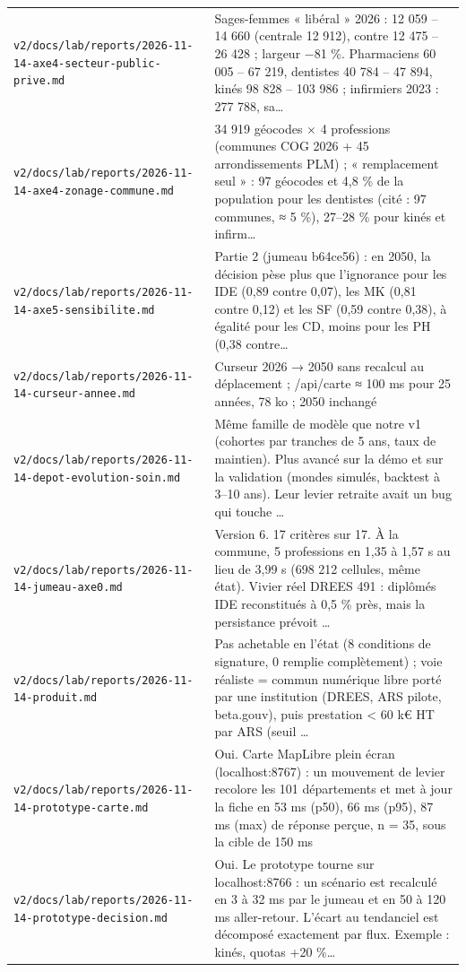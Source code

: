 \begin{small}
\begin{longtable}{@{}p{}p{}@{}}
\texttt{v2/docs/lab/reports/2026-11-14-axe4-secteur-public-prive.md} & Sages-femmes « libéral » 2026 : 12 059 – 14 660 (centrale 12 912), contre 12 475 – 26 428 ; largeur −81 \%. Pharmaciens 60 005 – 67 219, dentistes 40 784 – 47 894, kinés 98 828 – 103 986 ; infirmiers 2023 : 277 788, sa… \\
\texttt{v2/docs/lab/reports/2026-11-14-axe4-zonage-commune.md} & 34 919 géocodes × 4 professions (communes COG 2026 + 45 arrondissements PLM) ; « remplacement seul » : 97 géocodes et 4,8 \% de la population pour les dentistes (cité : 97 communes, ≈ 5 \%), 27–28 \% pour kinés et infirm… \\
\texttt{v2/docs/lab/reports/2026-11-14-axe5-sensibilite.md} & Partie 2 (jumeau b64ce56) : en 2050, la décision pèse plus que l'ignorance pour les IDE (0,89 contre 0,07), les MK (0,81 contre 0,12) et les SF (0,59 contre 0,38), à égalité pour les CD, moins pour les PH (0,38 contre… \\
\texttt{v2/docs/lab/reports/2026-11-14-curseur-annee.md} & Curseur 2026 → 2050 sans recalcul au déplacement ; /api/carte ≈ 100 ms pour 25 années, 78 ko ; 2050 inchangé \\
\texttt{v2/docs/lab/reports/2026-11-14-depot-evolution-soin.md} & Même famille de modèle que notre v1 (cohortes par tranches de 5 ans, taux de maintien). Plus avancé sur la démo et sur la validation (mondes simulés, backtest à 3–10 ans). Leur levier retraite avait un bug qui touche … \\
\texttt{v2/docs/lab/reports/2026-11-14-jumeau-axe0.md} & Version 6. 17 critères sur 17. À la commune, 5 professions en 1,35 à 1,57 s au lieu de 3,99 s (698 212 cellules, même état). Vivier réel DREES 491 : diplômés IDE reconstitués à 0,5 \% près, mais la persistance prévoit … \\
\texttt{v2/docs/lab/reports/2026-11-14-produit.md} & Pas achetable en l'état (8 conditions de signature, 0 remplie complètement) ; voie réaliste = commun numérique libre porté par une institution (DREES, ARS pilote, beta.gouv), puis prestation < 60 k€ HT par ARS (seuil … \\
\texttt{v2/docs/lab/reports/2026-11-14-prototype-carte.md} & Oui. Carte MapLibre plein écran (localhost:8767) : un mouvement de levier recolore les 101 départements et met à jour la fiche en 53 ms (p50), 66 ms (p95), 87 ms (max) de réponse perçue, n = 35, sous la cible de 150 ms \\
\texttt{v2/docs/lab/reports/2026-11-14-prototype-decision.md} & Oui. Le prototype tourne sur localhost:8766 : un scénario est recalculé en 3 à 32 ms par le jumeau et en 50 à 120 ms aller-retour. L'écart au tendanciel est décomposé exactement par flux. Exemple : kinés, quotas +20 \%… \\

\end{longtable}
\end{small}
